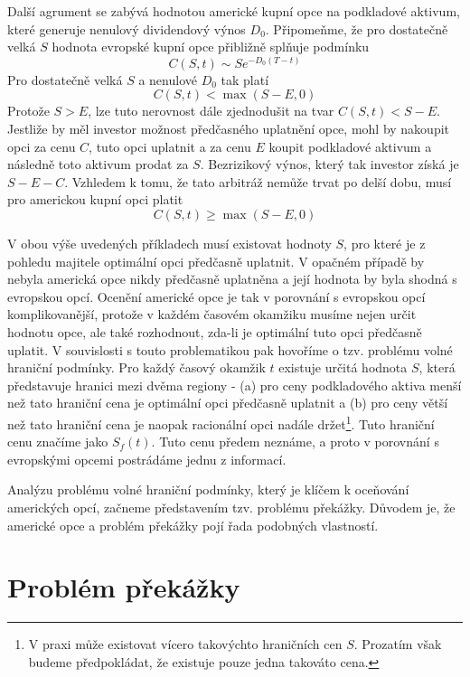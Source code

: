 \documentclass[a4paper]{book}
\begin{document}
Další agrument se zabývá hodnotou americké kupní opce na podkladové aktivum, které generuje nenulový dividendový výnos $D_0$. Připomeňme, že pro dostatečně velká $S$ hodnota evropské kupní opce přibližně splňuje podmínku
\begin{equation*}
C(S,t) \sim Se^{-D_0(T - t)}
\end{equation*}
Pro dostatečně velká $S$ a nenulové $D_0$ tak platí
\begin{equation*}
C(S,t) < \max(S - E,0)
\end{equation*}
Protože $S > E$, lze tuto nerovnost dále zjednodušit na tvar $C(S,t) < S - E$. Jestliže by měl investor možnost předčasného uplatnění opce, mohl by nakoupit opci za cenu $C$, tuto opci uplatnit a za cenu $E$ koupit podkladové aktivum a následně toto aktivum prodat za $S$. Bezrizikový výnos, který tak investor získá je $S - E - C$. Vzhledem k tomu, že tato arbitráž nemůže trvat po delší dobu, musí pro americkou kupní opci platit
\begin{equation*}
C(S,t) \ge \max(S - E, 0)
\end{equation*}

V obou výše uvedených příkladech musí existovat hodnoty $S$, pro které je z pohledu majitele optimální opci předčasně uplatnit. V opačném případě by nebyla americká opce nikdy předčasně uplatněna a její hodnota by byla shodná s evropskou opcí. Ocenění americké opce je tak v porovnání s evropskou opcí komplikovanější, protože v každém časovém okamžiku musíme nejen určit hodnotu opce, ale také rozhodnout, zda-li je optimální tuto opci předčasně uplatit. V souvislosti s touto problematikou pak hovoříme o tzv. problému volné hraniční podmínky. Pro každý časový okamžik $t$ existuje určitá hodnota $S$, která představuje hranici mezi dvěma regiony - (a) pro ceny podkladového aktiva menší než tato hraniční cena je optimální opci předčasně uplatnit a (b) pro ceny větší než tato hraniční cena je naopak racionální opci nadále držet\footnote{V praxi může existovat vícero takovýchto hraničních cen $S$. Prozatím však budeme předpokládat, že existuje pouze jedna takováto cena.}. Tuto hraniční cenu značíme jako $S_f(t)$. Tuto cenu předem neznáme, a proto v porovnání s evropskými opcemi postrádáme jednu z informací.

Analýzu problému volné hraniční podmínky, který je klíčem k oceňování amerických opcí, začneme představením tzv. problému překážky. Důvodem je, že americké opce a problém překážky pojí řada podobných vlastností.

\section{Problém překážky}
\end{document}
